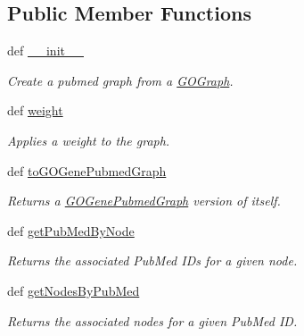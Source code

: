 \subsection*{Public Member Functions}
\begin{DoxyCompactItemize}
\item 
def \hyperlink{class_g_o_pubmed_graph_1_1_g_o_pubmed_graph_a67014838ca4e64ab6302e109cfb38baa}{\_\-\_\-init\_\-\_\-}
\begin{DoxyCompactList}\small\item\em Create a pubmed graph from a \hyperlink{namespace_g_o_graph}{GOGraph}. \item\end{DoxyCompactList}\item 
def \hyperlink{class_g_o_pubmed_graph_1_1_g_o_pubmed_graph_a1cd7af1343cfc3228db50e62ad1d79be}{weight}
\begin{DoxyCompactList}\small\item\em Applies a weight to the graph. \item\end{DoxyCompactList}\item 
def \hyperlink{class_g_o_pubmed_graph_1_1_g_o_pubmed_graph_a9c455a5443e6be4986d7bfbc1ef874c2}{toGOGenePubmedGraph}
\begin{DoxyCompactList}\small\item\em Returns a \hyperlink{namespace_g_o_gene_pubmed_graph}{GOGenePubmedGraph} version of itself. \item\end{DoxyCompactList}\item 
def \hyperlink{class_g_o_pubmed_graph_1_1_g_o_pubmed_graph_a24635a63eda34340ec00919adc165c7c}{getPubMedByNode}
\begin{DoxyCompactList}\small\item\em Returns the associated PubMed IDs for a given node. \item\end{DoxyCompactList}\item 
def \hyperlink{class_g_o_pubmed_graph_1_1_g_o_pubmed_graph_adc36d3c96e860a9db0dee1e60f0f9345}{getNodesByPubMed}
\begin{DoxyCompactList}\small\item\em Returns the associated nodes for a given PubMed ID. \item\end{DoxyCompactList}\end{DoxyCompactItemize}


